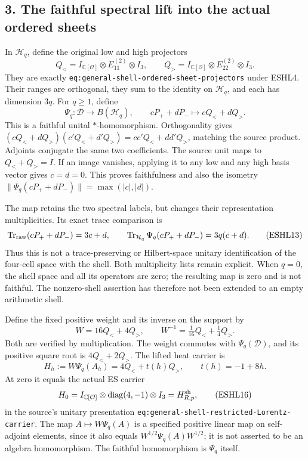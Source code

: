 \documentclass[
  10pt,
  a4paper,
]{article}
\begin{document}
\subsection{3. The faithful spectral lift into the actual ordered
sheets}\label{the-faithful-spectral-lift-into-the-actual-ordered-sheets}

In \(\mathcal H_q\), define the original low and high projectors \[
Q_<=I_{\mathbb C[\mathcal O]}\otimes E_{11}^{(2)}\otimes I_3,
\qquad Q_>=I_{\mathbb C[\mathcal O]}\otimes E_{22}^{(2)}\otimes I_3.
\tag{ESHL11}
\] They are exactly \texttt{eq:\allowbreak{}general-\allowbreak{}shell-\allowbreak{}ordered-\allowbreak{}sheet-\allowbreak{}projectors}
under ESHL4. Their ranges are orthogonal, they sum to the identity on
\(\mathcal H_q\), and each has dimension \(3q\). For \(q\ge1\), define
\[
\boxed{\Psi_q:\mathcal D\longrightarrow B(\mathcal H_q),
\qquad cP_++dP_-\longmapsto cQ_<+dQ_>.}
\tag{ESHL12}
\] This is a faithful unital \(*\)-homomorphism. Orthogonality gives
\((cQ_<+dQ_>)(c'Q_<+d'Q_>)=cc'Q_<+dd'Q_>\), matching the source product.
Adjoints conjugate the same two coefficients. The source unit maps to
\(Q_<+Q_>=I\). If an image vanishes, applying it to any low and any high
basis vector gives \(c=d=0\). This proves faithfulness and also the
isometry \(\|\Psi_q(cP_++dP_-)\|=\max(|c|,|d|)\).

The map retains the two spectral labels, but changes their
representation multiplicities. Its exact trace comparison is \[
\operatorname{Tr}_{\rm raw}(cP_++dP_-)=3c+d,
\qquad \operatorname{Tr}_{\mathcal H_q}\Psi_q(cP_++dP_-)=3q(c+d).
\tag{ESHL13}
\] Thus this is not a trace-preserving or Hilbert-space unitary
identification of the four-cell space with the shell. Both multiplicity
lists remain explicit. When \(q=0\), the shell space and all its
operators are zero; the resulting map is zero and is not faithful. The
nonzero-shell assertion has therefore not been extended to an empty
arithmetic shell.

Define the fixed positive weight and its inverse on the support by \[
W=16Q_<+4Q_>,\qquad W^{-1}=\tfrac1{16}Q_<+\tfrac14Q_>.
\tag{ESHL14}
\] Both are verified by multiplication. The weight commutes with
\(\Psi_q(\mathcal D)\), and its positive square root is \(4Q_<+2Q_>\).
The lifted heat carrier is \[
\boxed{H_h:=W\Psi_q(A_h)=4Q_<+t(h)Q_>,
\qquad t(h)=-1+8h.}
\tag{ESHL15}
\] At zero it equals the actual ES carrier \[
H_0=I_{\mathbb C[\mathcal O]}\otimes\operatorname{diag}(4,-1)\otimes I_3
=H^{\rm sh}_{R,p},
\tag{ESHL16}
\] in the source's unitary presentation
\texttt{eq:\allowbreak{}general-\allowbreak{}shell-\allowbreak{}restricted-\allowbreak{}Lorentz-\allowbreak{}carrier}. The map
\(A\mapsto W\Psi_q(A)\) is a specified positive linear map on
self-adjoint elements, since it also equals \(W^{1/2}\Psi_q(A)W^{1/2}\);
it is not asserted to be an algebra homomorphism. The faithful
homomorphism is \(\Psi_q\) itself.
\end{document}
